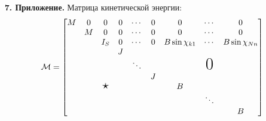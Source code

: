 {\bf 7. Приложение.}
Матрица кинетической энергии:
$$
\M = \begin{bmatrix}
    M & 0 & 0             & 0 & \cdots & 0 & 0                      & \cdots &0                       \\
      & M & 0             & 0 & \cdots & 0 & 0                      & \cdots & 0                      \\
      &   & I_S           & 0 & \cdots & 0 & B\sin\chi_{k1}         & \cdots & B\sin\chi_{Nn}         \\
      &   &               & J &        &   &                        &        &                        \\
      &   &               &   & \ddots &   &                        & \text{\huge 0}&                 \\
      &   &               &   &        & J &                        &        &           \\
      &   & \scalebox{1.5}{$\star$} &   &        &   & B                      &        &                        \\
      &   &               &   &        &   &                        & \ddots &                        \\
      &   &               &   &        &   &                        &        & B                      \\
\end{bmatrix}
$$
